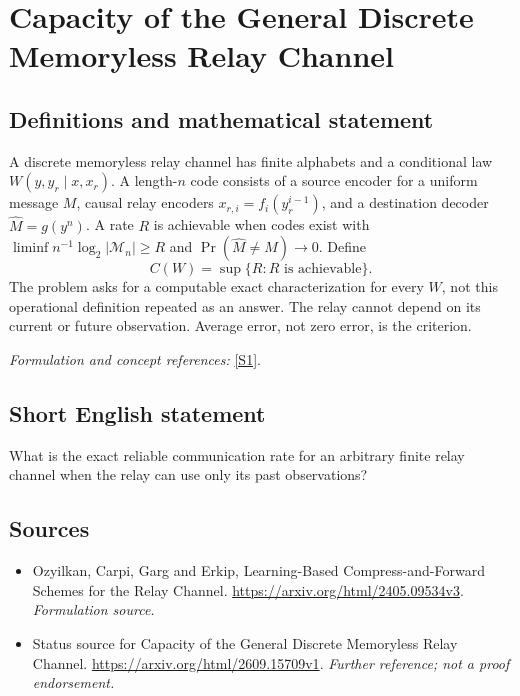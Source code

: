 \documentclass[11pt]{article}
\begin{document}
\section*{\texorpdfstring{Capacity of the General Discrete Memoryless Relay Channel}{Capacity of the General Discrete Memoryless Relay Channel}}\label{30006765}
\subsection{Definitions and mathematical statement}
A discrete memoryless relay channel has finite alphabets and a conditional law $W(y,y_r\mid x,x_r)$. A length-$n$ code consists of a source encoder for a uniform message $M$, causal relay encoders $x_{r,i}=f_i(y_r^{i-1})$, and a destination decoder $\widehat M=g(y^n)$. A rate $R$ is achievable when codes exist with $\liminf n^{-1}\log_2|\mathcal M_n|\ge R$ and $\Pr(\widehat M\ne M)\to0$. Define
\[
 C(W)=\sup\{R:R\text{ is achievable}
 \}.
\]
The problem asks for a computable exact characterization for every $W$, not this operational definition repeated as an answer. The relay cannot depend on its current or future observation. Average error, not zero error, is the criterion.
\par\smallskip\textit{Formulation and concept references:} \href{https://arxiv.org/html/2405.09534v3}{[S1]}.

\subsection{Short English statement}
What is the exact reliable communication rate for an arbitrary finite relay channel when the relay can use only its past observations?
\subsection{Sources}
\begin{itemize}
\item[S1]Ozyilkan, Carpi, Garg and Erkip, Learning-Based Compress-and-Forward Schemes for the Relay Channel.
\url{https://arxiv.org/html/2405.09534v3}.
\textit{Formulation source.}
\item[S2]Status source for Capacity of the General Discrete Memoryless Relay Channel.
\url{https://arxiv.org/html/2609.15709v1}.
\textit{Further reference; not a proof endorsement.}
\end{itemize}
\end{document}
